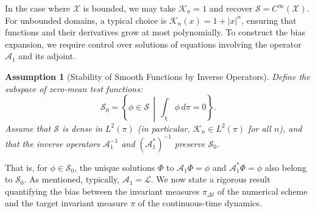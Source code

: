 \documentclass[11pt, twoside]{report}
\newtheorem{assumption}[theorem]{Assumption}
\begin{document}
In the case where $\mathcal{X}$ is bounded, we may take $\mathcal{K}_n = 1$ and recover $\mathcal{S} = C^\infty(\mathcal{X})$. For unbounded domains, a typical choice is $\mathcal{K}_n(x) = 1 + |x|^n$, ensuring that functions and their derivatives grow at most polynomially. To construct the bias expansion, we require control over solutions of equations involving the operator $\mathcal{A}_1$ and its adjoint.
\begin{assumption}[Stability of Smooth Functions by Inverse Operators] \label{ass:inverse_stability}
Define the subspace of zero-mean test functions:
\[
\mathcal{S}_0 = \left\{ \phi \in \mathcal{S} \,\middle|\, \int_\chi \phi \, d\pi = 0 \right\}.
\]
Assume that $\mathcal{S}$ is dense in $L^2(\pi)$ (in particular, $\mathcal{K}_n \in L^2(\pi)$ for all $n$), and that the inverse operators $\mathcal{A}_1^{-1}$ and $(\mathcal{A}_1^*)^{-1}$ preserve $\mathcal{S}_0$.
\end{assumption}
That is, for $\phi \in \mathcal{S}_0$, the unique solutions $\Phi$ to $\mathcal{A}_1 \Phi = \phi$ and $\mathcal{A}_1^* \Phi = \phi$ also belong to $\mathcal{S}_0$. As mentioned, typically, $\mathcal{A}_1 = \mathcal{L}$. We now state a rigorous result quantifying the bias between the invariant measures $\pi_{\Delta t}$ of the numerical scheme and the target invariant measure $\pi$ of the continuous-time dynamics.
\end{document}
